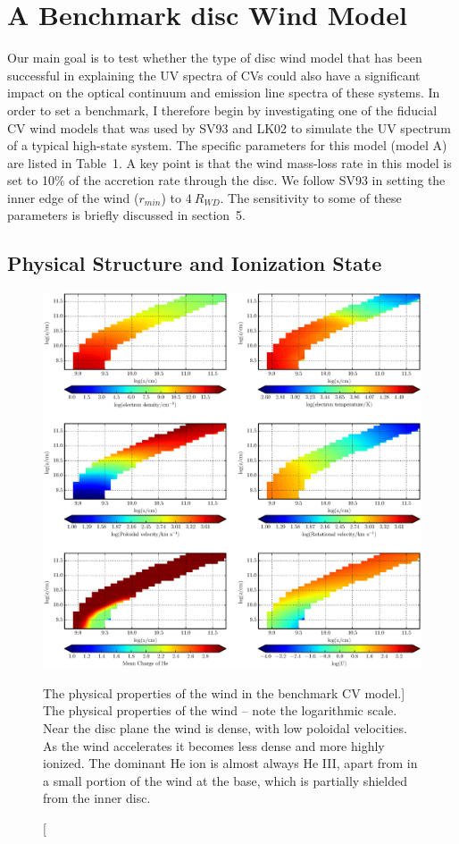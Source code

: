 \nocite{walker1963}

\section{A Benchmark disc Wind Model}
\label{modela}

Our main goal is to test whether the type of disc wind model that has
been successful in explaining the UV spectra of CVs could also have a
significant impact on the optical continuum and emission line spectra
of these systems. In order to set a benchmark, I therefore begin by
investigating one of the fiducial CV wind models that was used by SV93
and LK02 to simulate the UV spectrum of a typical high-state
system. The specific parameters for this model (model A) are listed in
Table~1. A key point is that the wind mass-loss rate in this model is
set to 10$\%$ of the accretion rate through the disc. We follow SV93
in setting the inner edge of the wind ($r_{min}$) to $4~R_{WD}$. 
The sensitivity to some of these parameters is briefly discussed in
section~5. 

\subsection{Physical Structure and Ionization State}
\label{modela_ionization}

\begin{figure}
\includegraphics[width=1.0\textwidth]{figures/05-cvpaper/fig5.eps}
\caption
[The physical properties of the wind in the benchmark CV model.]
{
The physical properties of the wind -- note the logarithmic scale. 
Near the disc plane the wind is dense, with low poloidal velocities.
As the wind accelerates it becomes less dense
and more highly ionized. The dominant He ion
is almost always He III, apart from in a small
portion of the wind at the base, which is partially shielded
from the inner disc.
}
\label{wind}
\end{figure}

